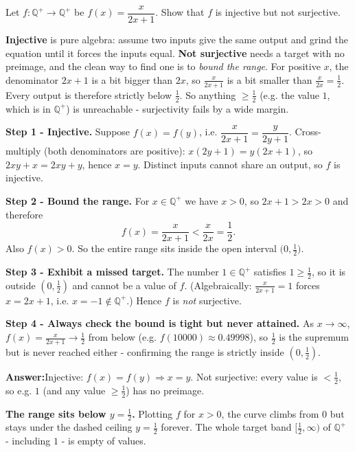 \documentclass[11pt,a4paper]{article}
\newcommand{\Q}{\mathbb{Q}}
\newcommand{\answer}[1]{\begin{answerbox}\centering\textbf{Answer:}\quad #1\end{answerbox}}
\begin{document}
\begin{problembox}[12]
Let $f:\Q^+\to\Q^+$ be $f(x)=\dfrac{x}{2x+1}$. Show that $f$ is injective but not surjective.
\end{problembox}

\begin{ideabox}
\textbf{Injective} is pure algebra: assume two inputs give the same output and grind the equation
until it forces the inputs equal. \textbf{Not surjective} needs a target with no preimage, and the
clean way to find one is to \emph{bound the range}. For positive $x$, the denominator $2x+1$ is a
bit bigger than $2x$, so $\tfrac{x}{2x+1}$ is a bit smaller than $\tfrac{x}{2x}=\tfrac12$. Every
output is therefore strictly below $\tfrac12$. So anything $\ge\tfrac12$ (e.g. the value $1$, which
is in $\Q^+$) is unreachable - surjectivity fails by a wide margin.
\end{ideabox}

\textbf{Step 1 - Injective.} Suppose $f(x)=f(y)$, i.e. $\dfrac{x}{2x+1}=\dfrac{y}{2y+1}$.
Cross-multiply (both denominators are positive): $x(2y+1)=y(2x+1)$, so $2xy+x=2xy+y$, hence
$x=y$. Distinct inputs cannot share an output, so $f$ is injective.

\textbf{Step 2 - Bound the range.} For $x\in\Q^+$ we have $x>0$, so $2x+1>2x>0$ and therefore
\[
f(x)=\frac{x}{2x+1}<\frac{x}{2x}=\frac12.
\]
Also $f(x)>0$. So the entire range sits inside the open interval $\bigl(0,\tfrac12\bigr)$.

\textbf{Step 3 - Exhibit a missed target.} The number $1\in\Q^+$ satisfies $1\ge\tfrac12$, so it is
outside $(0,\tfrac12)$ and cannot be a value of $f$. (Algebraically: $\tfrac{x}{2x+1}=1$ forces
$x=2x+1$, i.e. $x=-1\notin\Q^+$.) Hence $f$ is \emph{not} surjective.

\textbf{Step 4 - Always check the bound is tight but never attained.} As $x\to\infty$,
$f(x)=\tfrac{x}{2x+1}\to\tfrac12$ from below (e.g. $f(10000)\approx0.49998$), so $\tfrac12$ is the
supremum but is never reached either - confirming the range is strictly inside $(0,\tfrac12)$.

\answer{Injective: $f(x)=f(y)\Rightarrow x=y$. Not surjective: every value is $<\tfrac12$, so e.g.
$1$ (and any value $\ge\tfrac12$) has no preimage.}

\medskip
\textbf{The range sits below $y=\tfrac12$.} Plotting $f$ for $x>0$, the curve climbs from $0$ but
stays under the dashed ceiling $y=\tfrac12$ forever. The whole target band $\bigl[\tfrac12,\infty\bigr)$
of $\Q^+$ - including $1$ - is empty of values.
\end{document}
